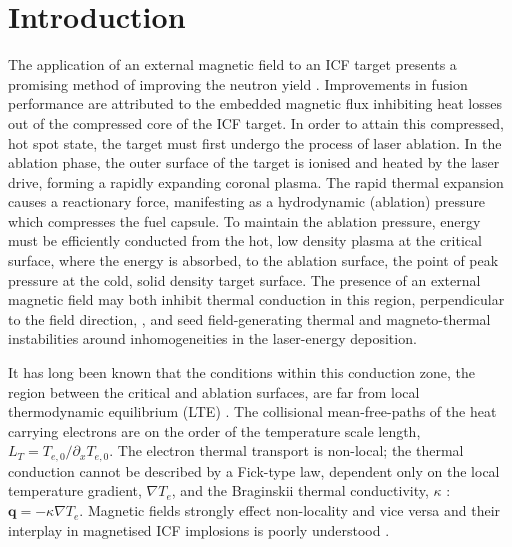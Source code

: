\documentclass[aip,reprint]{revtex4-1}
\begin{document}
\pacs{}%

\maketitle %

\section{Introduction}
The application of an external magnetic field to an ICF target presents a promising method of improving the neutron yield \cite{Chang2011}. 
Improvements in fusion performance are attributed to the embedded magnetic flux inhibiting heat losses out of the compressed core of the ICF target. In order to attain this compressed, hot spot state, the target must first undergo the process of laser ablation. In the ablation phase, the outer surface of the target is ionised and heated by the laser drive, forming a rapidly expanding coronal plasma. The rapid thermal expansion causes a reactionary force, manifesting as a hydrodynamic (ablation) pressure which compresses the fuel capsule. To maintain the ablation pressure, energy must be efficiently conducted from the hot, low density plasma at the critical surface, where the energy is absorbed, to the ablation surface, the point of peak pressure at the cold, solid density target surface. The presence of an external magnetic field may both inhibit thermal conduction in this region, perpendicular to the field direction, \cite{Braginskii1965}, and seed field-generating thermal \cite{Fruchtman1992} and magneto-thermal \cite{Bissell2010a} instabilities around inhomogeneities in the laser-energy deposition.

It has long been known that the conditions within this conduction zone, the region between the critical and ablation surfaces, are far from local thermodynamic equilibrium (LTE) \cite{Bell1981}.  The collisional mean-free-paths of the heat carrying electrons are on the order of the temperature scale length, $L_T= T_{e,0}/\partial_x T_{e,0}$. The electron thermal transport is non-local; the thermal conduction cannot be described by a Fick-type law, dependent only on the local temperature gradient, $\nabla T_e$, and the Braginskii thermal conductivity, $\kappa$ \cite{Braginskii1965}: $\mathbf{q} = -\kappa \nabla T_e$. Magnetic fields strongly effect non-locality and vice versa \cite{Brantov2003,Ridgers2008,Hill2018} and their interplay in magnetised ICF implosions is poorly understood \cite{Davies2015}.
\end{document}
